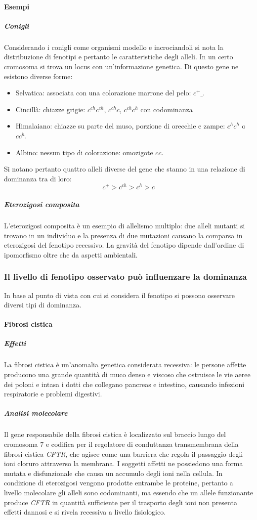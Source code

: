 \paragraph{Esempi}
\subparagraph{Conigli}
Considerando i conigli come organismi modello e incrociandoli si nota la distribuzione di fenotipi e pertanto le caratteristiche degli alleli. In un certo cromosoma si trova un locus
con un'informazione genetica. Di questo gene ne esistono diverse forme:
\begin{itemize}
	\item Selvatica: associata con una colorazione marrone del pelo: $c^+\_$.
	\item Cincill\`a: chiazze grigie: $c^{ch}c^{ch}$, $c^{ch}c$, $c^{ch}c^h$  con codominanza 
	\item Himalaiano: chiazze su parte del muso, porzione di orecchie e zampe: $c^hc^h$ o $cc^h$.
	\item Albino: nessun tipo di colorazione: omozigote $cc$.
\end{itemize}
Si notano pertanto quattro alleli diverse del gene che stanno in una relazione di dominanza tra di loro: 
\[c^+>c^{ch}>c^h>c\]
\subparagraph{Eterozigosi composita}
L'eterozigosi composita \`e un esempio di allelismo multiplo: due alleli mutanti si trovano in un individuo e la presenza di due mutazioni causano la comparsa in eterozigosi del fenotipo recessivo. 
La gravit\`a del fenotipo dipende dall'ordine di ipomorfismo oltre che da aspetti ambientali.
\subsubsection{Il livello di fenotipo osservato pu\`o influenzare la dominanza}
In base al punto di vista con cui si considera il fenotipo si possono osservare diversi tipi di dominanza.
\paragraph{Fibrosi cistica}
\subparagraph{Effetti}
La fibrosi cistica \`e un'anomalia genetica considerata recessiva: le persone affette producono una grande quantit\`a di muco denso e viscoso che ostruisce le vie aeree dei poloni e intasa i dotti che
collegano pancreas e intestino, causando infezioni respiratorie e problemi digestivi. 
\subparagraph{Analisi molecolare}
Il gene responsabile della fibrosi cistica \`e localizzato sul braccio lungo del cromosoma $7$ e codifica per il regolatore di conduttanza transmembrana della fibrosi cistica \emph{CFTR}, che agisce come
una barriera che regola il passaggio degli ioni cloruro attraverso la membrana. I soggetti affetti ne possiedono una forma mutata e disfunzionale che causa un accumulo degli ioni nella cellula. 
In condizione di eterozigosi vengono prodotte entrambe le proteine, pertanto a livello molecolare gli alleli sono codominanti, ma essendo che un allele funzionante produce \emph{CFTR} in quantit\`a 
sufficiente per il trasporto degli ioni non presenta effetti dannosi e si rivela recessiva a livello fisiologico. 
